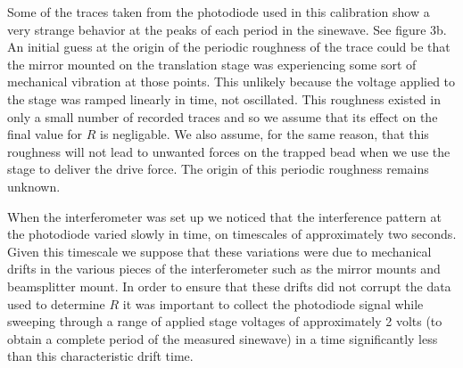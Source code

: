 \documentclass{report}
\begin{document}
Some of the traces taken from the photodiode used in this calibration show a very strange behavior at the peaks of each period in the sinewave. See figure 3b. An initial guess at the origin of the periodic roughness of the trace could be that the mirror mounted on the translation stage was experiencing some sort of mechanical vibration at those points. This unlikely because the voltage applied to the stage was ramped linearly in time, not oscillated. This roughness existed in only a small number of recorded traces and so we assume that its effect on the final value for $R$ is negligable. We also assume, for the same reason, that this roughness will not lead to unwanted forces on the trapped bead when we use the stage to deliver the drive force. The origin of this periodic roughness remains unknown.

When the interferometer was set up we noticed that the interference pattern at the photodiode varied slowly in time, on timescales of approximately two seconds. Given this timescale we suppose that these variations were due to mechanical drifts in the various pieces of the interferometer such as the mirror mounts and beamsplitter
mount. In order to ensure that these drifts did not corrupt the data used to determine $R$ it was important to collect the photodiode signal while sweeping through a range of applied stage voltages of approximately 2 volts (to obtain a complete period of the measured sinewave) in a time significantly less than this characteristic drift time.
\end{document}
